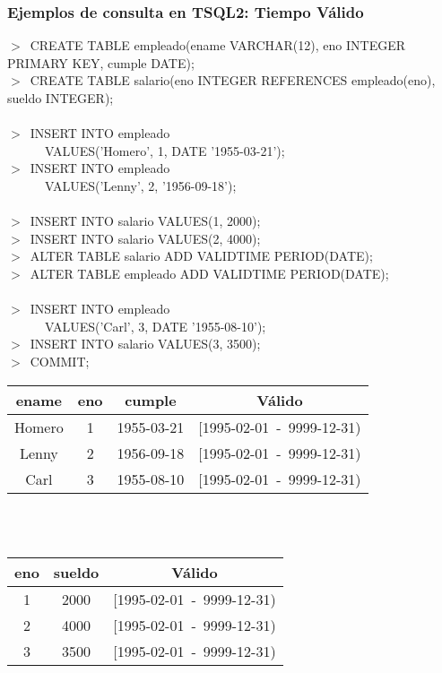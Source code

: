 \documentclass[a4paper,12pt,oneside]{report}
\begin{document}
\subsubsection*{Ejemplos de consulta en TSQL2: Tiempo V\'alido}
$>$\ CREATE TABLE empleado(ename VARCHAR(12), eno INTEGER PRIMARY KEY, cumple DATE);\\
$>$\ CREATE TABLE salario(eno INTEGER REFERENCES empleado(eno), sueldo INTEGER);\\
\ \\
$>$\ INSERT INTO empleado\\
\ \ \ \ \ \ VALUES('Homero', 1, DATE '1955-03-21');\\
$>$\ INSERT INTO empleado\\
\ \ \ \ \ \ VALUES('Lenny', 2, '1956-09-18');\\
\ \\
$>$\ INSERT INTO salario VALUES(1, 2000);\\
$>$\ INSERT INTO salario VALUES(2, 4000);\\
$>$\ ALTER TABLE salario ADD VALIDTIME PERIOD(DATE);\\
$>$\ ALTER TABLE empleado ADD VALIDTIME PERIOD(DATE);\\
\ \\
$>$\ INSERT INTO empleado\\
\ \ \ \ \ \ VALUES('Carl', 3, DATE '1955-08-10');\\
$>$\ INSERT INTO salario VALUES(3, 3500);\\
$>$\ COMMIT;
\begin{center}
\begin{tabular}{|c|c|c||c|}
\hline
ename & eno & cumple & V\'alido\\
\hline
Homero & 1 & 1955-03-21 & [1995-02-01\ -\ 9999-12-31)\\
\hline
Lenny & 2 & 1956-09-18 & [1995-02-01\ -\ 9999-12-31)\\
\hline
Carl & 3 & 1955-08-10 & [1995-02-01\ -\ 9999-12-31)\\
\hline
\end{tabular}\\
\ \\
\begin{tabular}{|c|c||c|}
\hline
eno & sueldo & V\'alido\\
\hline
1 & 2000 & [1995-02-01\ -\ 9999-12-31)\\
\hline
2 & 4000 & [1995-02-01\ -\ 9999-12-31)\\
\hline
3 & 3500 & [1995-02-01\ -\ 9999-12-31)\\
\hline
\end{tabular}
\end{center}
\end{document}
